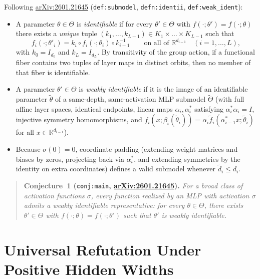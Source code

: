 \documentclass[11pt]{article}
\theoremstyle{plain}
\theoremstyle{definition}
\theoremstyle{remark}
\begin{document}
Following \href{https://arxiv.org/abs/2601.21645}{arXiv:2601.21645} (\texttt{def:submodel}, \texttt{defn:identii}, \texttt{def:weak\_ident}):
\begin{itemize}[leftmargin=2em,itemsep=2pt]
\item A parameter $\theta \in \Theta$ is \emph{identifiable} if for every $\theta' \in \Theta$ with $f(\cdot; \theta') = f(\cdot; \theta)$ there exists a \emph{unique} tuple $(k_1, \dots, k_{L-1}) \in K_1 \times \dots \times K_{L-1}$ such that
\[
f_i(\cdot; \theta'_i) = k_i \circ f_i(\cdot; \theta_i) \circ k_{i-1}^{-1}
\qquad \text{on all of } \mathbb{R}^{d_{i-1}} \quad (i = 1, \dots, L),
\]
with $k_0 = I_{d_0}$ and $k_L = I_{d_L}$. By transitivity of the group action, if a functional fiber contains two tuples of layer maps in distinct orbits, then no member of that fiber is identifiable.
\item A parameter $\theta' \in \Theta$ is \emph{weakly identifiable} if it is the image of an identifiable parameter $\tilde{\theta}$ of a same-depth, same-activation MLP submodel $\tilde{\Theta}$ (with full affine layer spaces, identical endpoints, linear maps $\alpha_i, \alpha_i^*$ satisfying $\alpha_i^*\alpha_i = I$, injective symmetry homomorphisms, and $f_i(x; \beta_i(\tilde{\theta}_i)) = \alpha_i \tilde{f}_i(\alpha_{i-1}^* x; \tilde{\theta}_i)$ for all $x \in \mathbb{R}^{d_{i-1}}$).
\item Because $\sigma(0) = 0$, coordinate padding (extending weight matrices and biases by zeros, projecting back via $\alpha_i^*$, and extending symmetries by the identity on extra coordinates) defines a valid submodel whenever $\tilde{d}_i \le d_i$.
\end{itemize}

\begin{quote}
\textbf{Conjecture~1 (\texttt{conj:main}, \href{https://arxiv.org/abs/2601.21645}{arXiv:2601.21645}).}
\emph{For a broad class of activation functions $\sigma$, every function realized by an MLP with activation $\sigma$ admits a weakly identifiable representative: for every $\theta \in \Theta$, there exists $\theta' \in \Theta$ with $f(\cdot; \theta) = f(\cdot; \theta')$ such that $\theta'$ is weakly identifiable.}
\end{quote}

\section{Universal Refutation Under Positive Hidden Widths}
\end{document}
